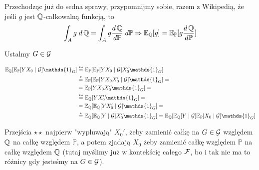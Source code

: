 \documentclass{article}
\newcommand{\E}{\mathbb{E}}
\renewcommand{\P}{\mathbb{P}}
\begin{document}
Przechodząc już do sedna sprawy, przypomnijmy sobie, razem z Wikipedią, że jeśli $g$ jest $\operatorname{\mathbb{Q}}$-całkowalną funkcją, to
$$\int_Ag\;d\Q=\int_Ag\frac{d\Q}{d\P}\;d\P\implies \E_{\Q}[g]=\E_{\P}[g\frac{d\Q}{d\P}]$$


Ustalmy $G\in\mathcal{G}$


\begin{align*}
  \E_{\Q}[\E_{\P}[YX_0\;|\;\set{G}]\mathds{1}_G]&\overset{\star\star}{=}\E_{\P}[\E_{\P}[YX_0\;|\;\set{G}]X_0'\mathds{1}_G]\\
        &\overset{\star}{=}\E_{\P}[\E_{\P}[YX_0X_0'\;|\;\set{G}]\mathds{1}_G]=\\
        &=\E_{\P}[YX_0X_0'\mathds{1}_G]=\\
        &\overset{\star\star}{=}\E_{\Q}[YX_0'\mathds{1}_G]=\\
        &=\E_{\Q}[\E_{\Q}[YX_0'\;|\;\set{G}]\mathds{1}_G]=\\
        &\overset{\star}{=}\E_{\Q}[\E_{\Q}[Y\;|\;\set{G}]X_0'\mathds{1}_G]=\E_{\Q}[\E_{\Q}[Y\;|\;\set{G}]\E_{\P}[X_0\;|\;\set{G}]\mathds{1}_G]
\end{align*}

Przejścia $\star\star$ najpierw "wypluwają" $X_0'$, żeby zamienić całkę na $G\in\mathcal{G}$ względem $\operatorname{\mathbb{Q}}$ na całkę względem $\P$, a potem zjadają $X_0$ żeby zamienić całkę względem $\P$ na całkę względem $\operatorname{\mathbb{Q}}$ (tutaj myślimy już w kontekścię całego $\mathcal{F}$, bo i tak nie ma to różnicy gdy jesteśmy na $G\in\mathcal{G}$).
\end{document}
